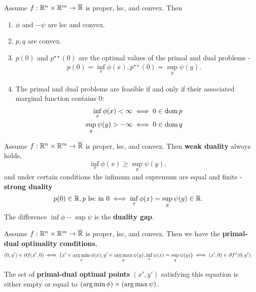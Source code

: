 \begin{thm}
  \label{sec:duality-optimization-2}
  Assume $f: \mathbb{R}^{n} \times \mathbb{R}^{m} \rightarrow \overline {\mathbb{R}}$ is proper,
  lsc, and convex.  Then
  \begin{enumerate}
  \item $\phi$ and $-\psi$ are lsc and convex.
  \item $p, q$ are convex.
  \item $p(0)$ and $p^{\star \star}(0)$ are the optimal values of the
    primal and dual problems -
    \begin{align}
      \label{eq:37}
      p(0)  = \inf_{x} \phi(x), p^{\star \star}(0) = \sup_{y} \psi(y).
    \end{align}
  \item The primal and dual problems are feasible if and only if their
    associated marginal function contains 0:
    \begin{align}
      \label{eq:38}
      \inf_{x} \phi(x) < \infty \iff 0 \in \operatorname*{dom} p \\
      \label{eq:39}
      \sup_{y} \psi(y) > -\infty \iff 0 \in \operatorname*{dom} q
    \end{align}
  \end{enumerate}
\end{thm}

\begin{thm}
  \label{sec:duality-optimization-4}
  Assume $f: \mathbb{R}^{n} \times \mathbb{R}^{m} \rightarrow \overline {\mathbb{R}}$ is proper,
  lsc, and convex. Then \textbf{weak duality} always holds,
  \begin{equation}
    \label{eq:40}
    \inf_{x} \phi(x) \geq \sup_{y} \psi(y),
  \end{equation} and under certain conditions the infimum and supremum
  are equal and finite - \textbf{strong duality}
  \begin{equation}
    \label{eq:41}
    p(0) \in \mathbb{R}, \text{$p$ lsc in $0$} \iff \inf_{x} \phi(x) =
    \sup_{y} \psi(y) \in \mathbb{R}.
  \end{equation}
  The difference $\inf \phi - \sup \psi$ is the \textbf{duality gap}.
\end{thm}

\begin{thm}
  \label{sec:duality-optimization-5}
  Assume $f: \mathbb{R}^{n} \times \mathbb{R}^{m} \rightarrow \overline {\mathbb{R}}$ is proper,
  lsc, and convex.  Then we have the \textbf{primal-dual optimality
    conditions},
  \begin{align}
    \label{eq:42}
    (0, y') \in \partial f(x', 0) \iff \{ x' \in \operatorname*{arg\,min}_{x} \phi(x),
    y' \in \operatorname*{arg\,max}_{y} \psi(y), \inf_{x} \psi(x) = \sup_{y} \psi(y) \}
    \iff (x', 0) \in \partial f^{\star}(0, y').
  \end{align}

  The set of \textbf{primal-dual optimal points} $(x', y')$ satisfying
  this equation is either empty or equal to $(\operatorname*{arg\,min} \phi) \times
  (\operatorname*{arg\,max} \psi)$.
\end{thm}

